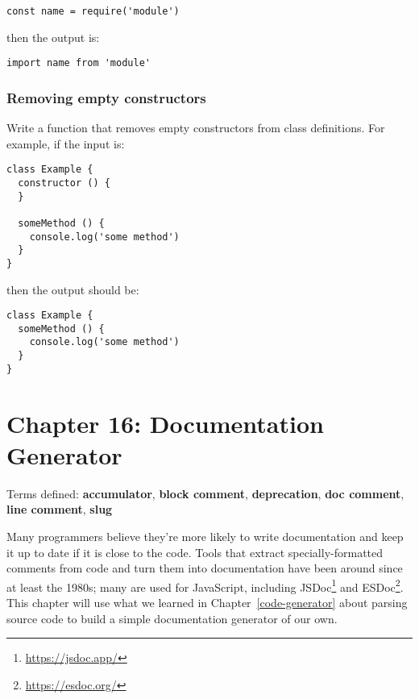 \documentclass[krantzl]{krantz}
\newcommand{\chapref}[1]{Chapter~\ref{#1}}
\newcommand{\glossref}[1]{\textbf{#1}}
\newcommand{\hreffoot}[2]{{#1}\footnote{\href{#2}{#2}}}
\begin{document}
\begin{lstlisting}[frame=single,frameround=tttt]
const name = require('module')
\end{lstlisting}


\noindent then the output is:

\begin{lstlisting}[frame=single,frameround=tttt]
import name from 'module'
\end{lstlisting}

\subsection*{Removing empty constructors}


Write a function that removes empty constructors from class definitions.
For example, if the input is:

\begin{lstlisting}[frame=single,frameround=tttt]
class Example {
  constructor () {
  }

  someMethod () {
    console.log('some method')
  }
}
\end{lstlisting}


\noindent then the output should be:

\begin{lstlisting}[frame=single,frameround=tttt]
class Example {
  someMethod () {
    console.log('some method')
  }
}
\end{lstlisting}

\chapter{Chapter 16: Documentation Generator}\label{doc-generator}


\noindent 
    Terms defined:
    \glossref{accumulator}, \glossref{block comment}, \glossref{deprecation}, \glossref{doc comment}, \glossref{line comment}, \glossref{slug}



Many programmers believe they're more likely to write documentation and keep it up to date
if it is close to the code.
Tools that extract specially-formatted comments from code and turn them into documentation
have been around since at least the 1980s;
many are used for JavaScript,
including \hreffoot{JSDoc}{https://jsdoc.app/} and \hreffoot{ESDoc}{https://esdoc.org/}.
This chapter will use what we learned in \chapref{code-generator} about parsing source code
to build a simple documentation generator of our own.
\end{document}
